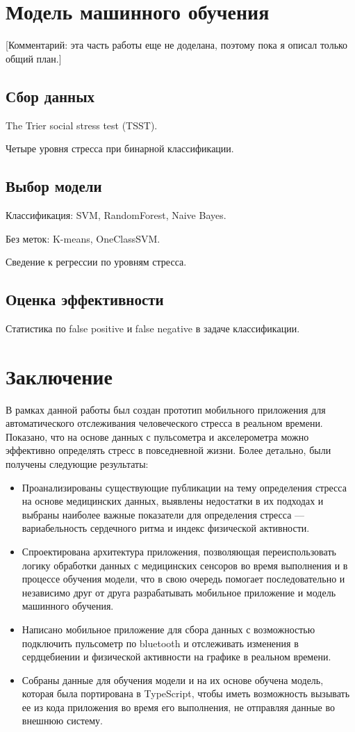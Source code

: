 \documentclass[14pt]{matmex-diploma-custom}
\begin{document}
\section{Модель машинного обучения}
[Комментарий: эта часть работы еще не доделана, поэтому пока я описал только общий план.]

\subsection{Сбор данных}
The Trier social stress test (TSST).

Четыре уровня стресса при бинарной классификации.

\subsection{Выбор модели}
Классификация: SVM, RandomForest, Naive Bayes.

Без меток: K-means, OneClassSVM.

Сведение к регрессии по уровням стресса.

\subsection{Оценка эффективности}
Статистика по false positive и false negative в задаче классификации.

\section*{Заключение}
В рамках данной работы был создан прототип мобильного приложения для
автоматического отслеживания человеческого стресса в реальном времени. Показано,
что на основе данных с пульсометра и акселерометра можно эффективно определять
стресс в повседневной жизни. Более детально, были получены следующие результаты:

\begin{itemize}
\item Проанализированы существующие публикации на тему определения стресса на
  основе медицинских данных, выявлены недостатки в их подходах и выбраны
  наиболее важные показатели для определения стресса — вариабельность сердечного
  ритма и индекс физической активности.
\item Спроектирована архитектура приложения, позволяющая переиспользовать логику
  обработки данных с медицинских сенсоров во время выполнения и в процессе
  обучения модели, что в свою очередь помогает последовательно и независимо друг
  от друга разрабатывать мобильное приложение и модель машинного обучения.
\item Написано мобильное приложение для сбора данных с возможностью подключить
  пульсометр по bluetooth и отслеживать изменения в сердцебиении и физической
  активности на графике в реальном времени.
\item Собраны данные для обучения модели и на их основе обучена модель, которая
  была портирована в TypeScript, чтобы иметь возможность вызывать ее из кода
  приложения во время его выполнения, не отправляя данные во внешнюю систему.
\end{itemize}

\setmonofont[Path=assets/fonts/, UprightFont=*-Regular, BoldFont=*-Bold,
ItalicFont=*-Italic, BoldItalicFont=*-BoldItalic,
Mapping=tex-text]{CMUTypewriterText}

 
\end{document}
